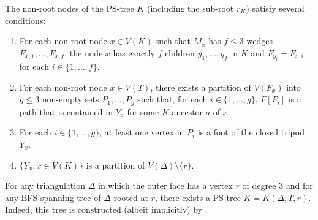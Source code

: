 \documentclass{patmorin}
\renewcommand{\proplabel}[1]{\label{prop:#1}}
\begin{document}
The non-root nodes of the PS-tree $K$ (including the sub-root $r_K$) satisfy several conditions:
\begin{enumerate}[(PR1)]
  \item \proplabel{children} For each non-root node $x\in V(K)$ such that $M_x$ has $f\le 3$ wedges $F_{x,1},\ldots,F_{x,f}$, the node $x$ has exactly $f$ children $y_1,\ldots,y_f$ in $K$ and $F_{y_i} = F_{x,i}$ for each $i\in\{1,\ldots,f\}$.
  
  \item \proplabel{ancestor-boundary} For each non-root node $x\in V(T)$, there exists a partition of $V(F_x)$ into $g\le 3$ non-empty sets $P_1,\ldots,P_g$ such that, for each $i\in\{1,\ldots,g\}$, $F[P_i]$ is a path that is contained in $Y_a$ for some $K$-ancestor $a$ of $x$. 
  
  \item \proplabel{tripod-feet} For each $i\in\{1,\ldots,g\}$, at least one vertex in $P_i$ is a foot of the closed tripod $\overline{Y}_x$.

  \item \proplabel{partition} $\{Y_x : x\in V(K)\}$ is a partition of $V(\Delta)\setminus\{r\}$.
\end{enumerate}

For any triangulation $\Delta$ in which the outer face has a vertex $r$ of degree 3 and for any BFS spanning-tree of $\Delta$ rooted at $r$, there exists a PS-tree $K=K(\Delta,T,r)$.  Indeed, this tree is constructed (albeit implicitly) by \citet[Proof of Lemma~14]{dujmovic.joret.ea:planar}.
\end{document}
